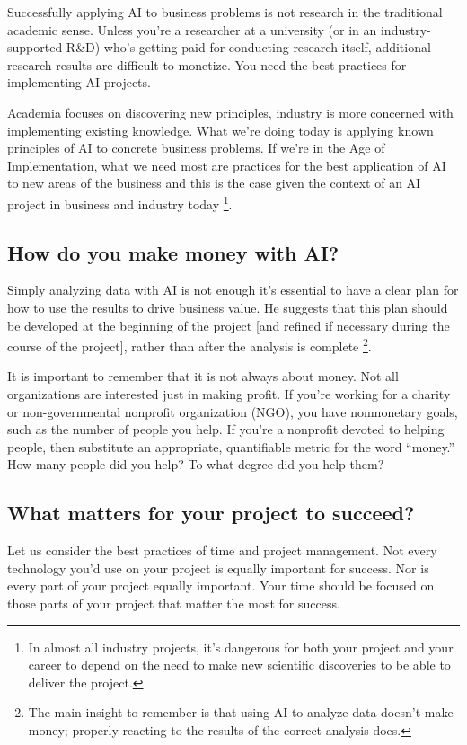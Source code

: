 Successfully applying AI to business problems is not research in
the traditional academic sense. Unless you're a researcher at a
university (or in an industry-supported R&D) who's getting paid
for conducting research itself, additional research results are
difficult to monetize. You need the best practices for
implementing AI projects.

Academia focuses on discovering new principles, industry is more
concerned with implementing existing knowledge. What we're
doing today is applying known principles of AI to concrete
business problems. If we're in the Age of Implementation, what
we need most are practices for the best application of AI to
new areas of the business and this is the case given the context
of an AI project in business and industry today
\footnote{
    In almost all industry projects, it's dangerous for both
    your project and your career to depend on the need to make
    new scientific discoveries to be able to deliver the project.
}.


\subsection{How do you make money with AI?}
Simply analyzing data with AI is not enough it's essential to
have a clear plan for how to use the results to drive business
value. He suggests that this plan should be developed at the
beginning of the project [and refined if necessary during
the course of the project], rather than after the analysis is
complete
\footnote{
    The main insight to remember is that using AI to analyze
    data doesn't make money; properly reacting to the results
    of the correct analysis does.
}.

It is important to remember that it is not always about money.
Not all organizations are interested just in making profit.
If you're working for a charity or non-governmental nonprofit
organization (NGO), you have nonmonetary goals, such as the
number of people you help. If you're a nonprofit devoted to
helping people, then substitute an appropriate, quantifiable
metric for the word “money.” How many people did you help? To
what degree did you help them?


\subsection{What matters for your project to succeed?}
Let us consider the best practices of time and project
management. Not every technology you'd use on your project
is equally important for success. Nor is every part of your
project equally important. Your time should be focused on 
those parts of your project that matter the most for success.

